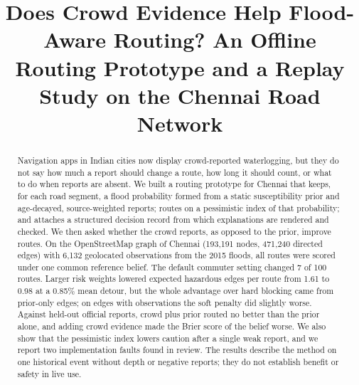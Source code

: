 \documentclass[conference]{IEEEtran}
\begin{document}

\title{Does Crowd Evidence Help Flood-Aware Routing? An Offline Routing Prototype and a Replay Study on the Chennai Road Network}

\author{
\and
{}
\and
{}
}

\maketitle

\begin{abstract}
Navigation apps in Indian cities now display crowd-reported waterlogging, but they do not say how much a report should change a route, how long it should count, or what to do when reports are absent. We built a routing prototype for Chennai that keeps, for each road segment, a flood probability formed from a static susceptibility prior and age-decayed, source-weighted reports; routes on a pessimistic index of that probability; and attaches a structured decision record from which explanations are rendered and checked. We then asked whether the crowd reports, as opposed to the prior, improve routes. On the OpenStreetMap graph of Chennai (193,191 nodes, 471,240 directed edges) with 6,132 geolocated observations from the 2015 floods, all routes were scored under one common reference belief. The default commuter setting changed 7 of 100 routes. Larger risk weights lowered expected hazardous edges per route from 1.61 to 0.98 at a 0.85\% mean detour, but the whole advantage over hard blocking came from prior-only edges; on edges with observations the soft penalty did slightly worse. Against held-out official reports, crowd plus prior routed no better than the prior alone, and adding crowd evidence made the Brier score of the belief worse. We also show that the pessimistic index lowers caution after a single weak report, and we report two implementation faults found in review. The results describe the method on one historical event without depth or negative reports; they do not establish benefit or safety in live use.
\end{abstract}
\end{document}
